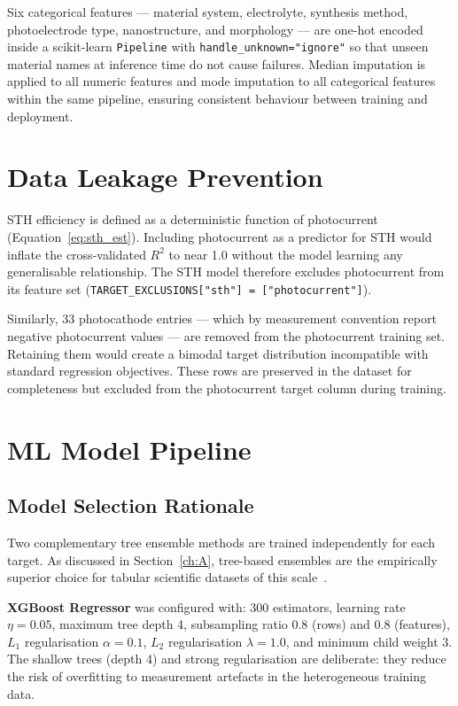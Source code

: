 Six categorical features --- material system, electrolyte, synthesis method,
photoelectrode type, nanostructure, and morphology --- are one-hot encoded inside
a scikit-learn \texttt{Pipeline} with \texttt{handle\_unknown="ignore"} so that
unseen material names at inference time do not cause failures.
Median imputation is applied to all numeric features and mode imputation to all
categorical features within the same pipeline, ensuring consistent behaviour
between training and deployment.

\section{Data Leakage Prevention}\label{sec:leakage}

STH efficiency is defined as a deterministic function of photocurrent
(Equation~\eqref{eq:sth_est}).
Including photocurrent as a predictor for STH would inflate the cross-validated
$R^2$ to near 1.0 without the model learning any generalisable relationship.
The STH model therefore excludes photocurrent from its feature set
(\texttt{TARGET\_EXCLUSIONS["sth"] = ["photocurrent"]}).

Similarly, 33 photocathode entries --- which by measurement convention report
negative photocurrent values --- are removed from the photocurrent training set.
Retaining them would create a bimodal target distribution incompatible with
standard regression objectives.
These rows are preserved in the dataset for completeness but excluded from
the photocurrent target column during training.

\section{ML Model Pipeline}

\subsection{Model Selection Rationale}\label{sec:model_selection}

Two complementary tree ensemble methods are trained independently for each target.
As discussed in Section~\ref{ch:A}, tree-based ensembles are the empirically
superior choice for tabular scientific datasets of this scale~\cite{grinsztajn2022tree}.

\textbf{XGBoost Regressor} was configured with: 300 estimators, learning rate
$\eta = 0.05$, maximum tree depth 4, subsampling ratio 0.8 (rows) and
0.8 (features), $L_1$ regularisation $\alpha = 0.1$, $L_2$ regularisation
$\lambda = 1.0$, and minimum child weight 3.
The shallow trees (depth 4) and strong regularisation are deliberate: they
reduce the risk of overfitting to measurement artefacts in the heterogeneous
training data.

